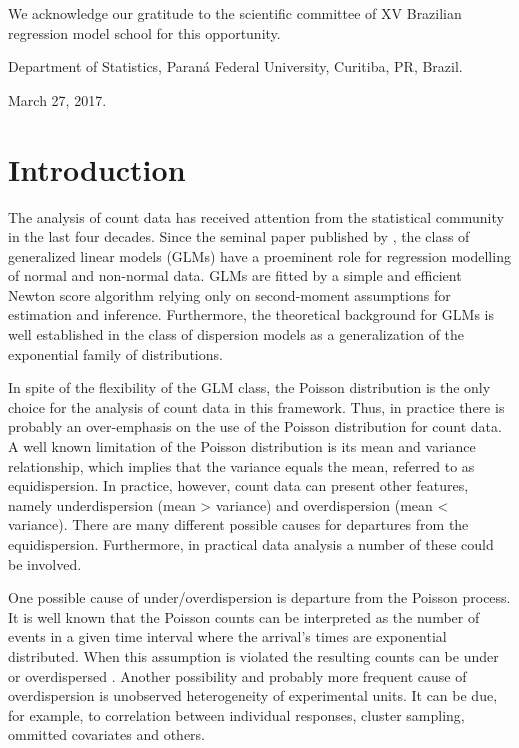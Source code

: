 \documentclass[9pt,a5paper,]{book}
\theoremstyle{definition}
\theoremstyle{definition}
\theoremstyle{remark}
\begin{document}
We acknowledge our gratitude to the scientific committee of XV Brazilian
regression model school for this opportunity.

Department of Statistics, Paraná Federal University, Curitiba, PR,
Brazil.

March 27, 2017.

\chapter{Introduction}\label{introduction}

The analysis of count data has received attention from the statistical
community in the last four decades. Since the seminal paper published by
\citet{Nelder1972}, the class of generalized linear models (GLMs) have a
proeminent role for regression modelling of normal and non-normal data.
GLMs are fitted by a simple and efficient Newton score algorithm relying
only on second-moment assumptions for estimation and inference.
Furthermore, the theoretical background for GLMs is well established in
the class of dispersion models \citep{Jorgensen1987, Jorgensen1997} as a
generalization of the exponential family of distributions.

In spite of the flexibility of the GLM class, the Poisson distribution
is the only choice for the analysis of count data in this framework.
Thus, in practice there is probably an over-emphasis on the use of the
Poisson distribution for count data. A well known limitation of the
Poisson distribution is its mean and variance relationship, which
implies that the variance equals the mean, referred to as
equidispersion. In practice, however, count data can present other
features, namely underdispersion (mean \textgreater{} variance) and
overdispersion (mean \textless{} variance). There are many different
possible causes for departures from the equidispersion. Furthermore, in
practical data analysis a number of these could be involved.

One possible cause of under/overdispersion is departure from the Poisson
process. It is well known that the Poisson counts can be interpreted as
the number of events in a given time interval where the arrival's times
are exponential distributed. When this assumption is violated the
resulting counts can be under or overdispersed \citep{Zeviani2014}.
Another possibility and probably more frequent cause of overdispersion
is unobserved heterogeneity of experimental units. It can be due, for
example, to correlation between individual responses, cluster sampling,
ommitted covariates and others.
\end{document}
